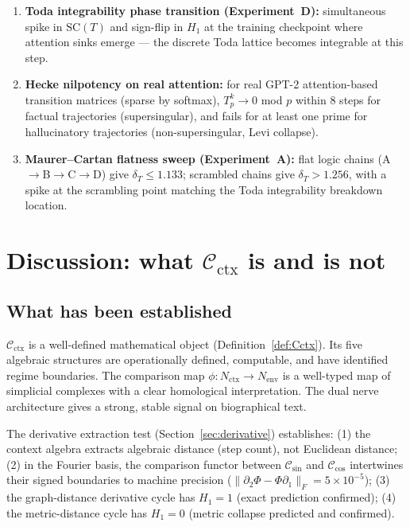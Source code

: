 \documentclass[11pt]{amsart}
\theoremstyle{definition}
\newcommand{\Cctx}{\mathcal{C}_{\!\mathrm{ctx}}}
\newcommand{\Nctx}{N_{\mathrm{ctx}}}
\newcommand{\Nenv}{N_{\mathrm{env}}}
\begin{document}
\begin{enumerate}
\item \textbf{Toda integrability phase transition (Experiment~D):}
  simultaneous spike in $\mathrm{SC}(T)$ and sign-flip in $H_1$ at the
  training checkpoint where attention sinks emerge --- the discrete
  Toda lattice becomes integrable at this step.

\item \textbf{Hecke nilpotency on real attention:}
  for real GPT-2 attention-based transition matrices (sparse by softmax),
  $T_p^k \to 0$ mod $p$ within 8 steps for factual trajectories
  (supersingular), and fails for at least one prime for hallucinatory
  trajectories (non-supersingular, Levi collapse).

\item \textbf{Maurer--Cartan flatness sweep (Experiment~A):}
  flat logic chains (A$\to$B$\to$C$\to$D) give $\delta_T \leq 1.133$;
  scrambled chains give $\delta_T > 1.256$, with a spike at the
  scrambling point matching the Toda integrability breakdown location.
\end{enumerate}

\section{Discussion: what $\Cctx$ is and is not}
\label{sec:discussion}

\subsection{What has been established}

$\Cctx$ is a well-defined mathematical object (Definition~\ref{def:Cctx}).
Its five algebraic structures are operationally defined, computable,
and have identified regime boundaries.
The comparison map $\phi: \Nctx \to \Nenv$ is a well-typed map of
simplicial complexes with a clear homological interpretation.
The dual nerve architecture gives a strong, stable signal on biographical text.

The derivative extraction test (Section~\ref{sec:derivative}) establishes:
(1) the context algebra extracts algebraic distance (step count), not Euclidean distance;
(2) in the Fourier basis, the comparison functor between $\mathcal{C}_{\sin}$ and
$\mathcal{C}_{\cos}$ intertwines their signed boundaries to machine precision
($\|\partial_2\Phi - \Phi\partial_1\|_F = 5\times10^{-5}$);
(3) the graph-distance derivative cycle has $H_1=1$ (exact prediction confirmed);
(4) the metric-distance cycle has $H_1=0$ (metric collapse predicted and confirmed).
\end{document}
